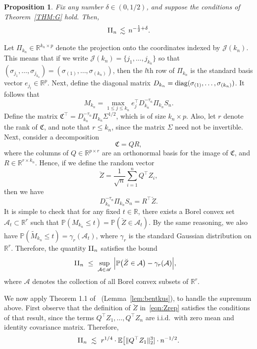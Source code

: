 \documentclass[aos,preprint]{imsart}
\numberwithin{equation}{section}
\theoremstyle{plain}
\newtheorem{proposition}{Proposition}[section]
\newcommand{\R}{\mathbb{R}}
\newcommand{\II}{\textsc{II}}
\newcommand{\J}{\mathcal{J}}
\renewcommand{\P}{\mathbb{P}}
\newcommand{\E}{\mathbb{E}}
\newcommand{\ttop}{^{\top}}
\newcommand{\ts}{\textstyle}
\newcommand{\1}{{\bf{1}}}
\newcommand{\0}{\mathbf{0}}
\newcommand{\diag}{\textup{diag}}
\begin{document}
\begin{proposition}\label{prop:bentkus}
Fix any number $\delta\in(0,1/2)$, and suppose the conditions of Theorem~\ref{THM:G} hold. Then, 
\begin{equation}\label{eqn:IInbound}
\II_n \, \lesssim \,  n^{-\frac 12+\delta}.
\end{equation}
\end{proposition}
%
%
%
\proof 
%
Let $\Pi_{k_n}\in\R^{k_n\times p}$ denote the projection onto the coordinates indexed by $\J(k_n)$. This means that if we write $\J(k_n)=\{j_1,\dots,j_{k_n}\}$ so that $(\sigma_{j_1},\dots,\sigma_{j_{k_n}})=(\sigma_{(1)},\dots,\sigma_{(k_n)})$, then the $l$th row of $\Pi_{k_n}$ is the standard basis vector $e_{j_l}\in\R^p$.
Next, define the diagonal matrix $D_{k_n}=\diag(\sigma_{(1)},\dots,\sigma_{(k_n)})$. It follows that
$$M_{k_n}=\max_{1\leq j\leq k_n} e_j\ttop D_{k_n}^{-\tau_n}\Pi_{k_n} S_n.$$
Define the matrix $\mathfrak{C}\ttop =D_{k_n}^{-\tau_n} \Pi_{k_n}\Sigma^{1/2}$, which is of size $k_n\times p$. Also, let $r$ denote the rank of $\mathfrak{C}$, and note that $r\leq k_n$, since the matrix $\Sigma$ need not be invertible. Next, consider a decomposition
$$\mathfrak{C}=QR,$$
where the columns of $Q\in\R^{p\times r}$ are an orthonormal basis for the image of $\mathfrak{C}$, and $R\in\R^{r\times k_n}$. Hence, if we define the random vector
\begin{equation}\label{eqn:Zrep}
\breve Z=\ts\frac{1}{\sqrt n}\sum_{i=1}^n Q\ttop Z_i,
\end{equation}
then we have
%
$$D_{k_n}^{-\tau_n}\Pi_{k_n} S_n =R\ttop \breve Z.$$
%
It is simple to check that for any fixed $t\in\R$, there exists a Borel convex set $\mathcal{A}_t\subset\R^{r}$ such that $\P(M_{k_n}\leq t)=\P(\breve Z\in\mathcal{A}_t)$. By the same reasoning, we also have $\P(\tilde M_{k_n}\leq t)=\gamma_r(\mathcal{A}_t)$, where $\gamma_{r}$ is the standard Gaussian distribution on $\R^{r}$. Therefore, the quantity $\II_n$  satisfies the bound
%
%
 \begin{equation}
 \begin{split}
 \II_n
 & \ \leq  \ \sup_{\mathcal{A}\in\mathscr{A}}\, \Big| \P\big(\breve Z\in \mathcal{A} \big)- \gamma_{r}(\mathcal{A})\Big|,
 \end{split}
\end{equation}
where $\mathscr{A}$ denotes the collection of all Borel convex subsets of $\R^{r}$. 


We now apply Theorem 1.1 of~\cite{Bentkus:2003} (Lemma~\ref{lem:bentkus}), to handle the supremum above. First observe that
%
the definition of $\breve Z$ in~\eqref{eqn:Zrep} satisfies the conditions of that result, since the terms $Q\ttop Z_1,\dots, Q\ttop Z_n$ are i.i.d.~with zero mean and identity covariance matrix. Therefore,
$$\II_n \ \lesssim \ r^{1/4}\cdot  \E\big[ \|Q\ttop Z_1\|_2^3] \cdot n^{-1/2}.$$
%
\end{document}
